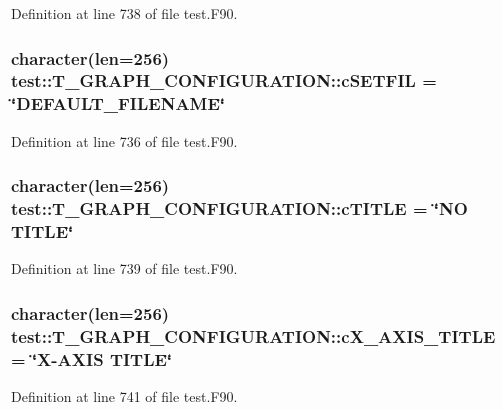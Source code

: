 Definition at line 738 of file test.F90.

\hypertarget{typetest_1_1_t___g_r_a_p_h___c_o_n_f_i_g_u_r_a_t_i_o_n_ae48ca27f38b9e65fc264c43b26cd520c}{
\subsubsection[{cSETFIL}]{\setlength{\rightskip}{0pt plus 5cm}character(len=256) {\bf test::T\_\-GRAPH\_\-CONFIGURATION::cSETFIL} = \char`\"{}DEFAULT\_\-FILENAME\char`\"{}}}
\label{typetest_1_1_t___g_r_a_p_h___c_o_n_f_i_g_u_r_a_t_i_o_n_ae48ca27f38b9e65fc264c43b26cd520c}


Definition at line 736 of file test.F90.

\hypertarget{typetest_1_1_t___g_r_a_p_h___c_o_n_f_i_g_u_r_a_t_i_o_n_a37e7da7a7e44b1fc2cd4cd249ca1e48f}{
\subsubsection[{cTITLE}]{\setlength{\rightskip}{0pt plus 5cm}character(len=256) {\bf test::T\_\-GRAPH\_\-CONFIGURATION::cTITLE} = \char`\"{}NO TITLE\char`\"{}}}
\label{typetest_1_1_t___g_r_a_p_h___c_o_n_f_i_g_u_r_a_t_i_o_n_a37e7da7a7e44b1fc2cd4cd249ca1e48f}


Definition at line 739 of file test.F90.

\hypertarget{typetest_1_1_t___g_r_a_p_h___c_o_n_f_i_g_u_r_a_t_i_o_n_afec33275cb847b0436e770201576f7ca}{
\subsubsection[{cX\_\-AXIS\_\-TITLE}]{\setlength{\rightskip}{0pt plus 5cm}character(len=256) {\bf test::T\_\-GRAPH\_\-CONFIGURATION::cX\_\-AXIS\_\-TITLE} = \char`\"{}X-\/AXIS TITLE\char`\"{}}}
\label{typetest_1_1_t___g_r_a_p_h___c_o_n_f_i_g_u_r_a_t_i_o_n_afec33275cb847b0436e770201576f7ca}


Definition at line 741 of file test.F90.

